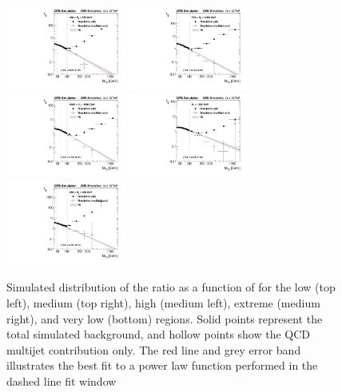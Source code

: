 \begin{figure}
	\centering
	\includegraphics[width=0.35\textwidth]{backgrounds/figs/ratio_HT450to575_j2toInf_b0toInf}
	\includegraphics[width=0.35\textwidth]{backgrounds/figs/ratio_HT575to1000_j2toInf_b0toInf}
	\includegraphics[width=0.35\textwidth]{backgrounds/figs/ratio_HT1000to1500_j2toInf_b0toInf}
	\includegraphics[width=0.35\textwidth]{backgrounds/figs/ratio_HT1500toInf_j2toInf_b0toInf}
	\includegraphics[width=0.35\textwidth]{backgrounds/figs/ratio_HT250to450_j2toInf_b0toInf}
	\renewcommand{\baselinestretch}{1.0}
	\caption[Simulated distribution of the \rphi ratio as a function of \mttwo for the low (top left), medium (top right), high (medium left), extreme (medium right), and very low (bottom) \HT regions.]{Simulated distribution of the \rphi ratio as a function of \mttwo for the low (top left), medium (top right), high (medium left), extreme (medium right), and very low (bottom) \HT regions. Solid points represent the total simulated background, and hollow points show the QCD multijet contribution only. The red line and grey error band illustrates the best fit to a power law function performed in the dashed line fit window}
	\label{fig:rphiDependence}
\end{figure}

